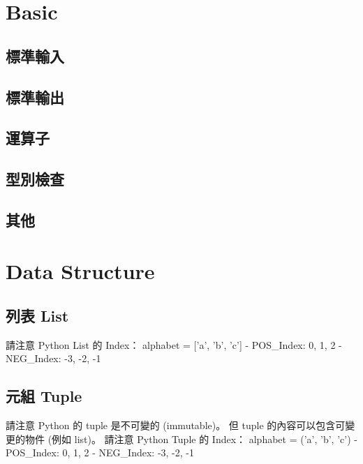 \documentclass[a4paper,10pt,twocolumn,oneside]{article}
\begin{document}
\pagestyle{fancy}
\fancyfoot{}
\fancyhead[R]{\thepage}
\renewcommand{\headrulewidth}{0.4pt}
\renewcommand{\contentsname}{Contents} 

\scriptsize
\tableofcontents

\section{Basic}
\subsection{標準輸入}

\subsection{標準輸出}

\subsection{運算子}

\subsection{型別檢查}

\subsection{其他}


\section{Data Structure}
\subsection{列表 List}
請注意 Python List 的 Index：
alphabet = ['a', 'b', 'c']  
- POS\_Index: 0,    1,  2
- NEG\_Index: -3,  -2, -1

\subsection{元組 Tuple}
請注意 Python 的 tuple 是不可變的 (immutable)。
但 tuple 的內容可以包含可變更的物件 (例如 list)。
請注意 Python Tuple 的 Index：
alphabet = ('a', 'b', 'c')  
- POS\_Index: 0,    1,  2
- NEG\_Index: -3,  -2, -1

\end{document}
